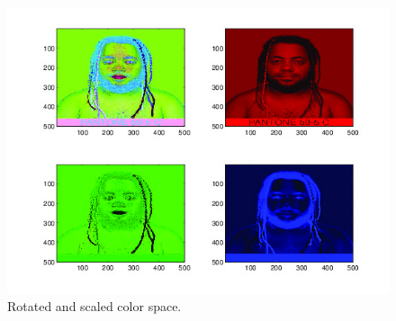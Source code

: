 \begin{figure}[h!]
  \centering
    \includegraphics[width=\textwidth]{Chapter4/Figs/rainbowmanRotatedScaled.jpg}
    \caption{Rotated and scaled color space.}
\end{figure}

